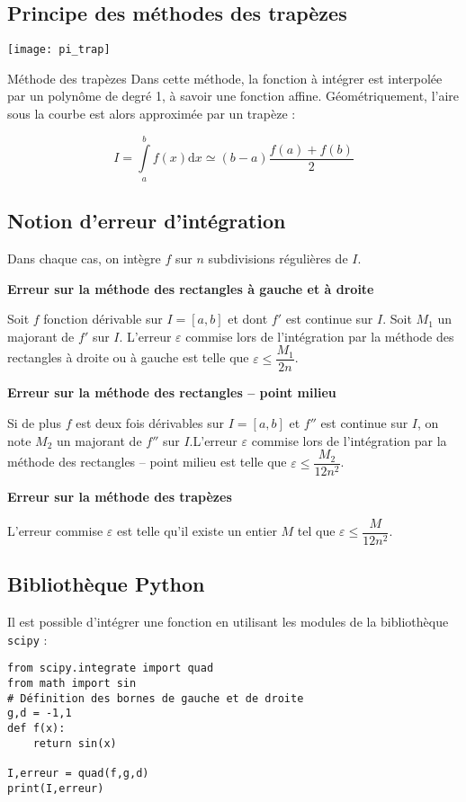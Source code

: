 \subsection{Principe des méthodes des trapèzes}


\begin{marginfigure}
\texttt{[image: pi\_trap]}
\end{marginfigure}

\begin{defi}{Méthode des trapèzes}
Dans cette méthode, la fonction à intégrer est interpolée par un polynôme de degré 1, à savoir une fonction affine. Géométriquement, l'aire sous la courbe est alors approximée par un trapèze :

$$
I = \int\limits_a^{b} f(x) \mathrm{d}x \simeq \left(b-a\right) \dfrac{f(a)+f(b)}{2} 
$$
\end{defi}




\subsection*{Notion d'erreur d'intégration}
\begin{resultat}
Dans chaque cas,  on intègre $f$ sur $n$ subdivisions régulières de $I$. 

\textbf{Erreur sur la méthode des rectangles à gauche et à droite}

Soit $f$ fonction dérivable sur $I=[a,b]$ et dont $f'$ est continue sur $I$. Soit $M_1$ un majorant de $f'$ sur $I$. L'erreur $\varepsilon$ commise lors de l'intégration par la méthode des rectangles à droite ou à gauche
 est telle que $ \varepsilon \leq \dfrac{M_1}{2n}$.

\textbf{Erreur sur la méthode des rectangles -- point milieu}

Si de plus $f$ est deux fois dérivables sur $I=[a,b]$ et $f''$ est continue sur $I$, on note $M_2$ un majorant de $f''$ sur $I$.L'erreur $\varepsilon$ commise lors de l'intégration par la méthode des rectangles -- point milieu est telle que $ \varepsilon \leq \dfrac{M_2}{12n^2}$.

\textbf{Erreur sur la méthode des trapèzes}

L'erreur commise $\varepsilon$ est telle qu'il existe un entier $M$ tel que $ \varepsilon \leq \dfrac{M}{12n^2}$.

\end{resultat}

\subsection*{Bibliothèque Python}
Il est possible d'intégrer une fonction en utilisant les modules de la bibliothèque \texttt{scipy} :
\begin{lstlisting}
from scipy.integrate import quad
from math import sin
# Définition des bornes de gauche et de droite
g,d = -1,1 
def f(x):
    return sin(x)
   
I,erreur = quad(f,g,d)
print(I,erreur)
\end{lstlisting}


